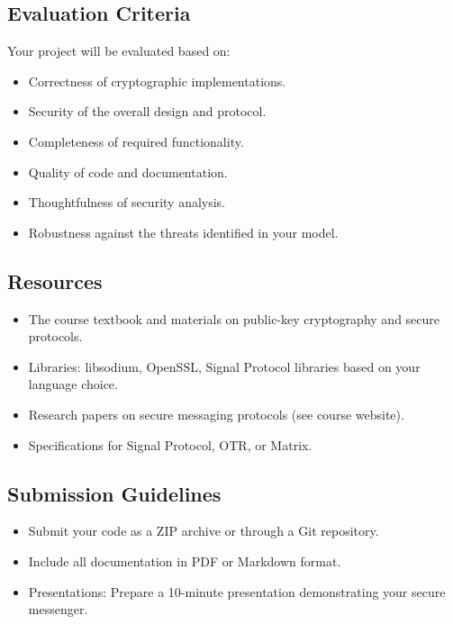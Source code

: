 \documentclass[10pt,a4paper,american]{exam}
\begin{document}
\subsection*{Evaluation Criteria}
Your project will be evaluated based on:

\begin{itemize}
	\item Correctness of cryptographic implementations.
	\item Security of the overall design and protocol.
	\item Completeness of required functionality.
	\item Quality of code and documentation.
	\item Thoughtfulness of security analysis.
	\item Robustness against the threats identified in your model.
\end{itemize}

\subsection*{Resources}
\begin{itemize}
	\item The course textbook and materials on public-key cryptography and secure protocols.
	\item Libraries: libsodium, OpenSSL, Signal Protocol libraries based on your language choice.
	\item Research papers on secure messaging protocols (see course website).
	\item Specifications for Signal Protocol, OTR, or Matrix.
\end{itemize}

\subsection*{Submission Guidelines}
\begin{itemize}
	\item Submit your code as a ZIP archive or through a Git repository.
	\item Include all documentation in PDF or Markdown format.
	\item Presentations: Prepare a 10-minute presentation demonstrating your secure messenger.
\end{itemize}
\end{document}
